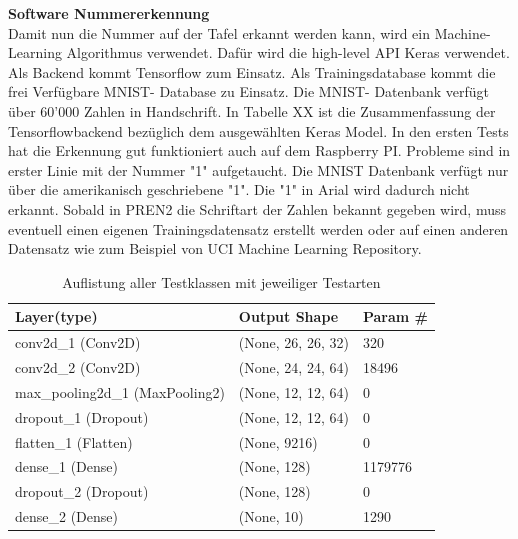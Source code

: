 \documentclass[../../main.tex]{subfiles}
\begin{document}
    \textbf{Software Nummererkennung}\\
    Damit nun die Nummer auf der Tafel erkannt werden kann, wird ein Machine- Learning Algorithmus verwendet. Dafür wird die high-level API Keras verwendet. Als Backend kommt Tensorflow zum Einsatz. Als Trainingsdatabase kommt die frei Verfügbare MNIST- Database zu Einsatz. Die MNIST- Datenbank verfügt über 60'000 Zahlen in Handschrift. In Tabelle XX ist die Zusammenfassung der Tensorflowbackend bezüglich dem ausgewählten Keras Model. In den ersten Tests hat die Erkennung gut funktioniert auch auf dem Raspberry PI. Probleme sind in erster Linie mit der Nummer "1" aufgetaucht. Die MNIST Datenbank verfügt nur über die amerikanisch geschriebene "1". Die "1" in Arial wird dadurch nicht erkannt. Sobald in PREN2 die Schriftart der Zahlen bekannt gegeben wird, muss eventuell einen eigenen Trainingsdatensatz erstellt werden oder auf einen anderen Datensatz wie zum Beispiel von UCI Machine Learning Repository.
    \begin{table}[H]
            \begin{center}
                \begin{tabular}{ | l | l | p{3cm} |}
                \hline
                \textbf{Layer(type)}  & \textbf{Output Shape} & \textbf{Param \#}\\\hline
                conv2d\_1 (Conv2D) & (None, 26, 26, 32) & 320 \\\hline
                conv2d\_2 (Conv2D) & (None, 24, 24, 64) & 18496 \\ \hline
                max\_pooling2d\_1 (MaxPooling2) & (None, 12, 12, 64) & 0\\ \hline
                dropout\_1 (Dropout) & (None, 12, 12, 64) & 0 \\ \hline
                flatten\_1 (Flatten) & (None, 9216) & 0 \\ \hline
                dense\_1 (Dense) & (None, 128) & 1179776 \\ \hline
                dropout\_2 (Dropout)  & (None, 128) & 0 \\ \hline
                dense\_2 (Dense)  & (None, 10) & 1290 \\ \hline
                \end{tabular}
            \end{center}
            \caption{Auflistung aller Testklassen mit jeweiliger Testarten}
            \label{tab:Testklassen}
        \end{table}
\end{document}
